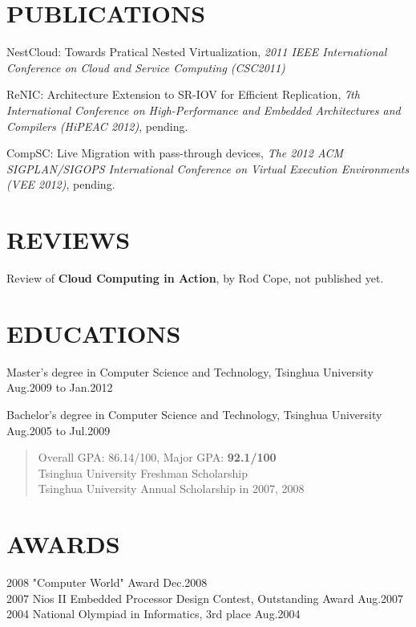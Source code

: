 \documentclass[11pt]{res} %
\begin{document}
\begin{resume}


\section{PUBLICATIONS}
NestCloud: Towards Pratical Nested Virtualization, \emph{2011 IEEE
  International Conference on Cloud and Service Computing (CSC2011)}

ReNIC: Architecture Extension to SR-IOV for Efficient Replication,
\emph{7th International Conference on High-Performance and Embedded
  Architectures and Compilers (HiPEAC 2012)}, pending.

CompSC: Live Migration with pass-through devices, \emph{The 2012 ACM
  SIGPLAN/SIGOPS International Conference on Virtual Execution
  Environments (VEE 2012)}, pending.

\section{REVIEWS}
Review of \textbf{Cloud Computing in Action}, by Rod Cope, not published yet.

\section{EDUCATIONS}
Master's degree in Computer Science and Technology, Tsinghua University \\
\hspace*{\fill} Aug.2009 to Jan.2012

Bachelor's degree in Computer Science and Technology, Tsinghua University \\
\hspace*{\fill} Aug.2005 to Jul.2009
\begin{quote}
Overall GPA: 86.14/100, Major GPA: \textbf{92.1/100} \\
Tsinghua University Freshman Scholarship \\
Tsinghua University Annual Scholarship in 2007, 2008 \\
\end{quote}

\section{AWARDS}
2008 "Computer World" Award \hfill Dec.2008 \\
2007 Nios II Embedded Processor Design Contest, Outstanding Award \hfill Aug.2007 \\
2004 National Olympiad in Informatics, 3rd place \hfill Aug.2004

\end{resume}
\end{document}
